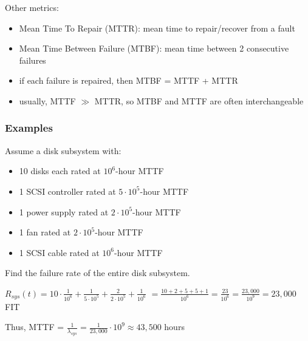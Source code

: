 \documentclass[12pt]{extarticle}
\begin{document}
	Other metrics:

	\begin{itemize}
		\item Mean Time To Repair (MTTR): mean time to repair/recover from a fault
		\item Mean Time Between Failure (MTBF): mean time between 2 consecutive failures
		\item if each failure is repaired, then MTBF = MTTF + MTTR
		\item usually, MTTF $\gg$ MTTR, so MTBF and MTTF are often interchangeable
	\end{itemize}

	\subsubsection{Examples}

	Assume a disk subsystem with:

	\begin{itemize}
		\item 10 disks each rated at $10^6$-hour MTTF
		\item 1 SCSI controller rated at $5 \cdot 10^5$-hour MTTF
		\item 1 power supply rated at $2 \cdot 10^5$-hour MTTF
		\item 1 fan rated at $2 \cdot 10^5$-hour MTTF
		\item 1 SCSI cable rated at $10^6$-hour MTTF
	\end{itemize}

	Find the failure rate of the entire disk subsystem.

	$R_{sys}(t) = 10 \cdot \frac{1}{10^6} + \frac{1}{5 \cdot 10^5} + \frac{2}{2 \cdot 10^5} + \frac{1}{10^6}$
	$			= \frac{10 + 2 + 5 + 5 + 1}{10^6} = \frac{23}{10^6} = \frac{23,000}{10^9} = 23,000$ FIT

	Thus, MTTF = $\frac{1}{\lambda_{sys}} = \frac{1}{23,000} \cdot 10^9 \approx 43,500$ hours
\end{document}
